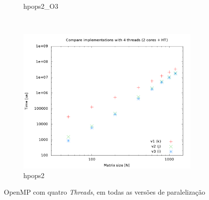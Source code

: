 \documentclass[a4paper, 12pt]{article}
\begin{document}
\begin{figure}[H]
\begin{subfigure}[H]{0.5\textwidth}
        \caption{hpops2\_O3}
        \label{fig:hpops2_O3_cmp_2t}
    \end{subfigure}
    ~ %
    \begin{subfigure}[H]{0.5\textwidth}
        \includegraphics[width=\textwidth]{hpops2_cmp_versions-4t}
        \caption{hpops2}
        \label{fig:hpops2_cmp_2t}
    \end{subfigure}%
    \caption{OpenMP com quatro \textit{Threads}, em todas as versões de paralelização}\label{fig:animals}
\end{figure}

\newpage
\end{document}
